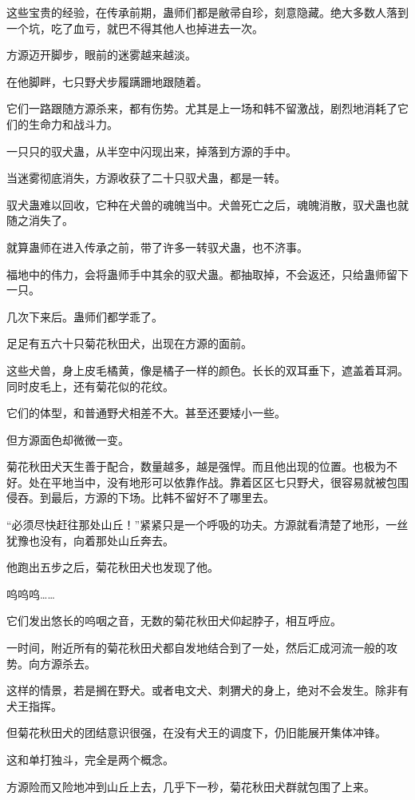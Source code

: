 \begin{this_body}
这些宝贵的经验，在传承前期，蛊师们都是敝帚自珍，刻意隐藏。绝大多数人落到一个坑，吃了血亏，就巴不得其他人也掉进去一次。

方源迈开脚步，眼前的迷雾越来越淡。

在他脚畔，七只野犬步履蹒跚地跟随着。

它们一路跟随方源杀来，都有伤势。尤其是上一场和韩不留激战，剧烈地消耗了它们的生命力和战斗力。

一只只的驭犬蛊，从半空中闪现出来，掉落到方源的手中。

当迷雾彻底消失，方源收获了二十只驭犬蛊，都是一转。

驭犬蛊难以回收，它种在犬兽的魂魄当中。犬兽死亡之后，魂魄消散，驭犬蛊也就随之消失了。

就算蛊师在进入传承之前，带了许多一转驭犬蛊，也不济事。

福地中的伟力，会将蛊师手中其余的驭犬蛊。都抽取掉，不会返还，只给蛊师留下一只。

几次下来后。蛊师们都学乖了。

足足有五六十只菊花秋田犬，出现在方源的面前。

这些犬兽，身上皮毛橘黄，像是橘子一样的颜色。长长的双耳垂下，遮盖着耳洞。同时皮毛上，还有菊花似的花纹。

它们的体型，和普通野犬相差不大。甚至还要矮小一些。

但方源面色却微微一变。

菊花秋田犬天生善于配合，数量越多，越是强悍。而且他出现的位置。也极为不好。处在平地当中，没有地形可以依靠作战。靠着区区七只野犬，很容易就被包围侵吞。到最后，方源的下场。比韩不留好不了哪里去。

“必须尽快赶往那处山丘！”紧紧只是一个呼吸的功夫。方源就看清楚了地形，一丝犹豫也没有，向着那处山丘奔去。

他跑出五步之后，菊花秋田犬也发现了他。

呜呜呜……

它们发出悠长的呜咽之音，无数的菊花秋田犬仰起脖子，相互呼应。

一时间，附近所有的菊花秋田犬都自发地结合到了一处，然后汇成河流一般的攻势。向方源杀去。

这样的情景，若是搁在野犬。或者电文犬、刺猬犬的身上，绝对不会发生。除非有犬王指挥。

但菊花秋田犬的团结意识很强，在没有犬王的调度下，仍旧能展开集体冲锋。

这和单打独斗，完全是两个概念。

方源险而又险地冲到山丘上去，几乎下一秒，菊花秋田犬群就包围了上来。


\end{this_body}
